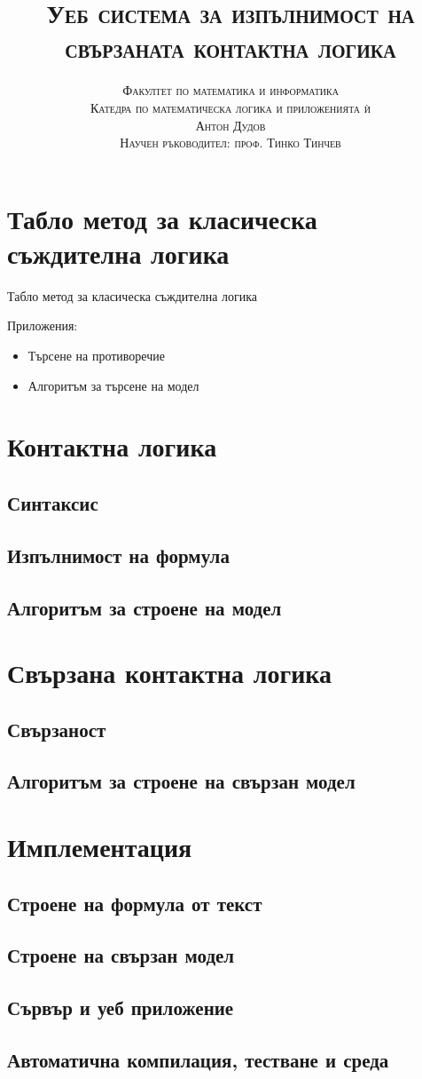 \documentclass[14pt, aspectratio=169]{beamer}
\date[\today]{}
\title{\textsc{Уеб система за изпълнимост на свързаната контактна логика}}
\author[Антон Дудов]{
	\textsc{Факултет по математика и информатика} \\
	\textsc{Катедра по математическа логика и приложенията ѝ} \\ [8mm]
	\textsc{Антон Дудов} \\ [8mm]
	\small\textsc{Научен ръководител: проф. Тинко Тинчев}
}
\begin{document}
\begin{frame}
\titlepage
\end{frame}

\begin{frame}
\tableofcontents
\end{frame}

\section{Табло метод за класическа съждителна логика}

\begin{frame}{Табло метод за класическа съждителна логика}

Приложения:
\begin{itemize}
	\item<1-> Търсене на противоречие
	\item<2-> Алгоритъм за търсене на модел
\end{itemize}

\end{frame}

\section{Контактна логика}
\subsection{Синтаксис}
\subsection{Изпълнимост на формула}
\subsection{Алгоритъм за строене на модел}

\section{Свързана контактна логика}
\subsection{Свързаност}
\subsection{Алгоритъм за строене на свързан модел}

\section{Имплементация}
\subsection{Строене на формула от текст}
\subsection{Строене на свързан модел}
\subsection{Сървър и уеб приложение}
\subsection{Автоматична компилация, тестване и среда}
\end{document}
